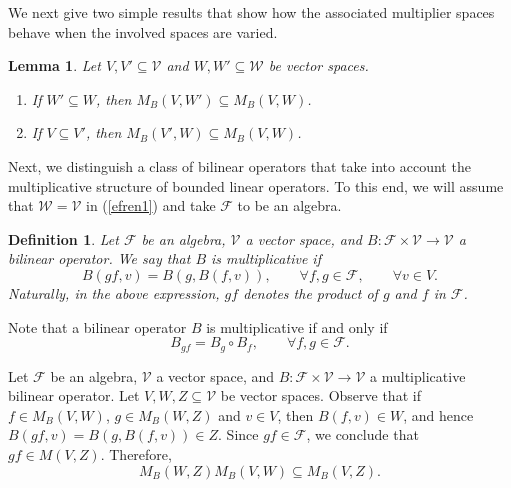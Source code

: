 \documentclass[14pt, a4paper]{article}  %
\providecommand{\pare}[1]{\left( #1\right) }
\newcommand{\tien}{\rightarrow}
\newcommand{\F}{\mathcal{F}}
\newcommand{\V}{\mathcal{V}}
\newcommand{\W}{\mathcal{W}}
\newtheorem{lemma}{Lemma}[section]
\newtheorem{definition}{Definition}[section]
\begin{document}
We next give two simple results that show how the associated multiplier spaces behave when the involved spaces are varied. 

\begin{lemma}\label{q10_0_b} \label{piz26}
		Let $V,V'\subseteq \V$ and $W,W'\subseteq \W$ be vector spaces.
	\begin{enumerate}
		\item[i.] If $W'\subseteq W$, then $M_{B}\pare{V,W'}\subseteq M_{B}\pare{V,W}$. 
		\item[ii.] If $V\subseteq V'$, then $M_{B}\pare{V',W}\subseteq M_{B}\pare{V,W}$. 
	\end{enumerate} 
\end{lemma}

 


 
	 

Next, we distinguish a class of bilinear operators that take into account the multiplicative structure of bounded linear operators. To this end, we will assume that $\W=\V$ in (\ref{efren1}) and take $\F$ to be an algebra.  


 

\begin{definition}
	Let  $\mathcal{F}$ be an algebra,   $\mathcal{V}$ a vector space, and $B:\F\times \mathcal{V}\tien   \mathcal{V}$ a bilinear operator. We say that   $B$ is \emph{multiplicative}  if \begin{equation}\label{lola7}
		B\pare{g  f,v}=B\pare{g,B\pare{f,v}},\qquad \forall f, g\in \F,\qquad \forall v\in V.
	\end{equation}
	Naturally, in the above expression, $gf$ denotes the product of $g$ and $f$ in $\F$.
\end{definition} 
Note that a bilinear operator $B$ is multiplicative if and only if
\begin{equation}\label{lola1}
	B_{gf}=B_{g}\circ B_{f},\qquad \forall f,g\in \F.
\end{equation}


Let  $\mathcal{F}$ be an algebra,  $\mathcal{V}$ a vector space, and $B:\F\times \mathcal{V}\tien   \mathcal{V}$ a multiplicative bilinear operator. Let  $V,W,Z\subseteq \mathcal{V}$ be vector spaces. Observe that if $f\in M_{B}\pare{V,W}$, $g\in M_{B}\pare{W,Z}$ and $v\in V$, then  $B\pare{f,v}\in W$, and hence $B\pare{gf,v}=B\pare{g, B\pare{f,v}}\in Z$. Since  $gf\in \F$, we conclude that  $ gf\in M\pare{V,Z}$.  Therefore, 
\begin{equation}\label{piz25_1}
	M_{B}\pare{W,Z} M_{B}\pare{V,W}  \subseteq M_{B}\pare{V,Z}.
\end{equation} 
\end{document}
